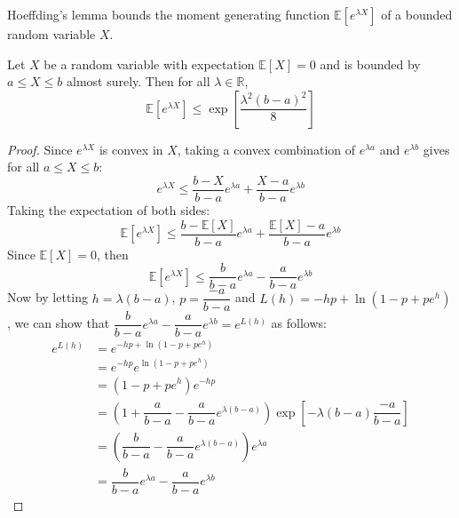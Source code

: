 \documentclass[11pt]{report} %
\begin{document}
Hoeffding's lemma bounds the moment generating function $\mathbb{E}\left[e^{\lambda X}\right]$ of a bounded random variable $X$.
\begin{lemma}
Let $X$ be a random variable with expectation $\mathbb{E}\left[X\right] = 0$ and is bounded by $a \leq X \leq b$ almost surely. Then for all $\lambda \in \mathbb{R}$,
\begin{equation}
\mathbb{E}\left[e^{\lambda X}\right] \leq \exp\left[\dfrac{\lambda^{2}\left(b - a\right)^{2}}{8}\right]
\end{equation}
\end{lemma}
\begin{proof}
Since $e^{\lambda X}$ is convex in $X$, taking a convex combination of $e^{\lambda a}$ and $e^{\lambda b}$ gives for all $a \leq X \leq b$:
\begin{equation}
e^{\lambda X} \leq \dfrac{b - X}{b - a}e^{\lambda a} + \dfrac{X - a}{b - a}e^{\lambda b}
\end{equation}
Taking the expectation of both sides:
\begin{equation}
\mathbb{E}\left[e^{\lambda X}\right] \leq \dfrac{b - \mathbb{E}\left[X\right]}{b - a}e^{\lambda a} + \dfrac{\mathbb{E}\left[X\right] - a}{b - a}e^{\lambda b}
\end{equation}
Since $\mathbb{E}\left[X\right] = 0$, then
\begin{equation}
\mathbb{E}\left[e^{\lambda X}\right] \leq \dfrac{b}{b - a}e^{\lambda a} - \dfrac{a}{b - a}e^{\lambda b}
\end{equation}
Now by letting $h = \lambda\left(b - a\right)$, $p = \dfrac{-a}{b - a}$ and $L\left(h\right) = -hp + \ln\left(1 - p + pe^{h}\right)$, we can show that $\dfrac{b}{b - a}e^{\lambda a} - \dfrac{a}{b - a}e^{\lambda b} = e^{L\left(h\right)}$ as follows:
\begin{align}
e^{L\left(h\right)} &= e^{-hp + \ln\left(1 - p + pe^{h}\right)} \\
&= e^{-hp}e^{\ln\left(1 - p + pe^{h}\right)} \\
&= \left(1 - p + pe^{h}\right)e^{-hp} \\
&= \left(1 + \dfrac{a}{b - a} - \dfrac{a}{b - a}e^{\lambda\left(b - a\right)}\right)\exp\left[-\lambda\left(b - a\right)\dfrac{-a}{b - a}\right] \\
&= \left(\dfrac{b}{b - a} - \dfrac{a}{b - a}e^{\lambda\left(b - a\right)}\right)e^{\lambda a} \\
&= \dfrac{b}{b - a}e^{\lambda a} - \dfrac{a}{b - a}e^{\lambda b}
\end{align}

\end{proof}
\end{document}
